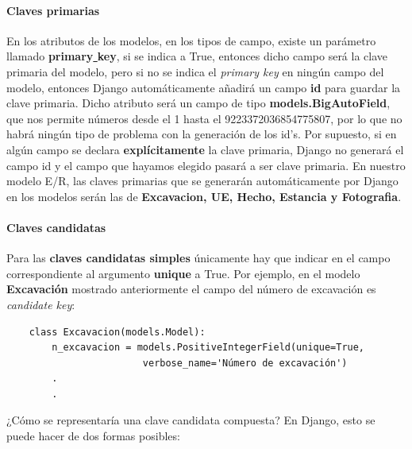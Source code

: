     \paragraph{Claves primarias} \underline{}
    \newline En los atributos de los modelos, en los tipos de campo, existe un parámetro llamado
    \textbf{primary\underline{ }key}, si se indica a True, entonces dicho campo será la clave
    primaria del modelo, pero si no se indica el \textit{primary key} en ningún campo del modelo,
    entonces Django automáticamente añadirá un campo \textbf{id} para guardar la clave primaria.
    Dicho atributo será un campo de tipo \textbf{models.BigAutoField}, que nos permite números
    desde el 1 hasta el 9223372036854775807, por lo que no habrá ningún tipo de problema con
    la generación de los id's. Por supuesto, si en algún campo se declara \textbf{explícitamente}
    la clave primaria, Django no generará el campo id y el campo que hayamos elegido pasará a
    ser clave primaria. En nuestro modelo E/R, las claves primarias que se generarán
    automáticamente por Django en los modelos serán las de \textbf{Excavacion, UE, Hecho,
    Estancia y Fotografia}. 
    
    \paragraph{Claves candidatas} \underline{}
    \newline Para las \textbf{claves candidatas simples} únicamente hay que indicar en el campo
    correspondiente al argumento \textbf{unique} a True. Por ejemplo, en el modelo
    \textbf{Excavación} mostrado anteriormente el campo del número de excavación es
    \textit{candidate key}:
    
    
    \begin{verbatim}
    class Excavacion(models.Model):
        n_excavacion = models.PositiveIntegerField(unique=True, 
                        verbose_name='Número de excavación')
        .
        .
    \end{verbatim}

    ¿Cómo se representaría una clave candidata compuesta? En Django, esto se puede hacer de
    dos formas posibles:

